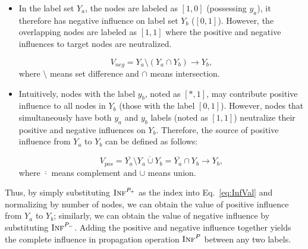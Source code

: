 \begin{itemize}[leftmargin=*]
\item In the label set $Y_a$, the nodes are labeled as $[1,0]$ (possessing $y_a$), it therefore has negative influence on label set $Y_b$ ($[0,1]$). However, the overlapping nodes are labeled as $[1,1]$ where the positive and negative influences to target nodes are neutralized. 
\begin{definition} \label{def:NegInf}
\begin{equation}
      V_{neg} = Y_a \setminus (Y_a \cap Y_b) \rightarrow Y_b ,
\end{equation}
where $\setminus$ means set difference and $\cap$ means intersection.
\end{definition}
\item Intuitively, nodes with the label $y_b$, noted as $[*, 1]$, may contribute positive influence to all nodes in $Y_b$ (those with the label $[0, 1]$). However, nodes that simultaneously have both $y_a$ and $y_b$ labels (noted as $[1, 1]$) neutralize their positive and negative influences on $Y_b$. Therefore, the source of positive influence from $Y_a$ to $Y_b$ can be defined as follows:
\begin{definition} \label{def:PosInf}
\begin{equation}
   V_{pos} = \overline{Y_a} \setminus \overline{Y_a \cup Y_b} = \overline{Y_a} \cap Y_b \rightarrow Y_b,
\end{equation}
where $\overline{\cdot}$ means complement and $\cup$ means union.
\end{definition}
\end{itemize}
Thus, by simply substituting $\textsc{Inf}^{P_+}$ as the index into Eq.~\ref{eq:InfVal} and normalizing by number of nodes, we can obtain the value of positive influence from $Y_a$ to $Y_b$; similarly, we can obtain the value of negative influence by substituting $\textsc{Inf}^{P_-}$.
Adding the positive and negative influence together yields the complete influence in propagation operation $\textsc{Inf}^{P}$ between any two labels.



